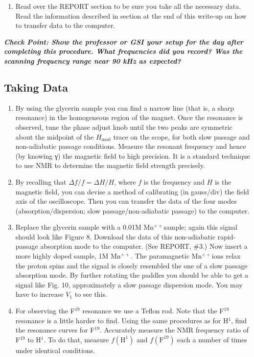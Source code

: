 \documentclass{../lab}
\begin{document}
\begin{enumerate}
    \item Read over the REPORT section to be sure you take all the necessary data. Read the information described in section at the end of this write-up on how to transfer data to the computer.
\end{enumerate}

\emph{\textbf{Check Point: Show the professor or GSI your setup for the day after completing this procedure. What frequencies did you record? Was the scanning frequency range near 90 kHz as expected?}}

\subsection{Taking Data}

\begin{enumerate}
    \item By using the glycerin sample you can find a narrow line (that is, a sharp resonance) in the homogeneous region of the magnet. Once the resonance is observed, tune the phase adjust knob until the two peaks are symmetric about the midpoint of the $H_\text{mod}$ trace on the scope, for both slow passage and non-adiabatic passage conditions. Measure the resonant frequency and hence (by knowing γ) the magnetic field to high precision. It is a standard technique to use NMR to determine the magnetic field strength precisely.

    \item By recalling that $\Delta f / f = \Delta H / H$, where $f$ is the frequency and $H$ is the magnetic field, you can devise a method of calibrating (in gauss/div) the field axis of the oscilloscope. Then you can transfer the data of the four modes (absorption/dispersion; slow passage/non-adiabatic passage) to the computer.
    
    \item Replace the glycerin sample with a 0.01M Mn$^{++}$sample; again this signal should look like Figure 8. Download the data of this non-adiabatic rapid-passage absorption mode to the computer. (See REPORT, \#3.) Now insert a more highly doped sample, 1M Mn$^{++}$. The paramagnetic Mn$^{++}$ions relax the proton spins and the signal is closely resembled the one of a slow passage absorption mode. By further rotating the paddles you should be able to get a signal like Fig. 10, approximately a slow passage dispersion mode. You may have to increase $V_1$ to see this.
    
    \item For observing the F$^{19}$ resonance we use a Teflon rod. Note that the F$^{19}$ resonance is a little harder to find. Using the same procedures as for H$^1$, find the resonance curves for F$^{19}$. Accurately measure the NMR frequency ratio of F$^{19}$ to H$^1$. To do that, measure $f(\text{H}^1)$ and $f(\text{F}^{19})$ each a number of times under identical conditions.
    

\end{enumerate}
\end{document}
